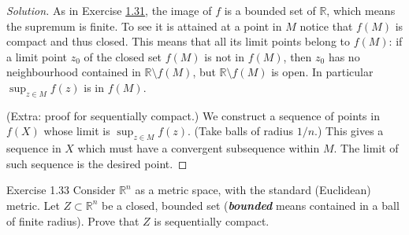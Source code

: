 \begin{proof}[Solution]\leavevmode
As in Exercise \hyperref[exer:1.31]{1.31}, the image of $f$ is a bounded set of $ \mathbb{R}$, which means the supremum is finite. To see it is attained at a point in $M$ notice that $f(M)$ is compact and thus closed. This means that all its limit points belong to  $f(M)$: if a limit point $z_0$ of the closed set $f(M)$ is not in $f(M)$, then $z_0$ has no neighbourhood contained in $\mathbb{R}\setminus f(M)$, but $\mathbb{R}\setminus f(M)$ is open. In particular  $\operatorname{sup}_{z \in M}f(z)$ is in $f(M)$.

(Extra: proof for sequentially compact.) We construct a sequence of points in $f(X)$ whose limit is  $\operatorname{sup}_{z \in M}f(z)$. (Take balls of radius $1/n$.) This gives a sequence in $X$ which must have a convergent subsequence within $M$. The limit of such sequence is the desired point.
\end{proof}

\begin{thing4}{Exercise 1.33}\label{exer:1.33}\leavevmode
Consider $\mathbb{R}^n$ as a metric space, with the standard (Euclidean) metric. Let $Z \subset \mathbb{R}^n$ be a closed, bounded set (\textit{\textbf{bounded}} means contained in a ball of finite radius). Prove that $Z$ is sequentially compact.
\end{thing4}

